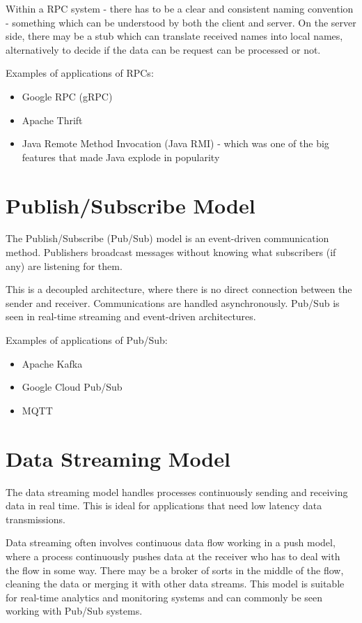 Within a RPC system - there has to be a clear and consistent naming convention - something which can be understood by both the client and server. On the server side, there may be a stub which can translate received names into local names, alternatively to decide if the data can be request can be processed or not.

Examples of applications of RPCs:
\begin{itemize}
    \item Google RPC (gRPC)
    \item Apache Thrift
    \item Java Remote Method Invocation (Java RMI) - which was one of the big features that made Java explode in popularity
\end{itemize}

\section{Publish/Subscribe Model}
The Publish/Subscribe (Pub/Sub) model is an event-driven communication method. Publishers broadcast messages without knowing what subscribers (if any) are listening for them.

This is a decoupled architecture, where there is no direct connection between the sender and receiver. Communications are handled asynchronously. Pub/Sub is seen in real-time streaming and event-driven architectures.

Examples of applications of Pub/Sub:
\begin{itemize}
    \item Apache Kafka
    \item Google Cloud Pub/Sub
    \item MQTT
\end{itemize}

\section{Data Streaming Model}
The data streaming model handles processes continuously sending and receiving data in real time. This is ideal for applications that need low latency data transmissions. 

Data streaming often involves continuous data flow working in a push model, where a process continuously pushes data at the receiver who has to deal with the flow in some way. There may be a broker of sorts in the middle of the flow, cleaning the data or merging it with other data streams. This model is suitable for real-time analytics and monitoring systems and can commonly be seen working with Pub/Sub systems.

